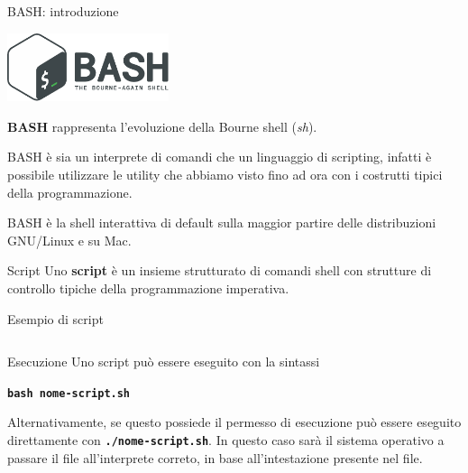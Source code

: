 \documentclass{beamer}
\begin{document}
    \begin{frame}{BASH: introduzione}
        \begin{center}
            \includegraphics[height=2cm, keepaspectratio]{images/bash.pdf}
        \end{center}
        \textbf{BASH} rappresenta l'evoluzione della Bourne shell (\textit{sh}).

        \vspace{0.5cm}

        BASH è sia un interprete di comandi che un linguaggio di scripting, infatti è
        possibile utilizzare le utility che abbiamo visto fino ad ora con i costrutti tipici
        della programmazione.

        \vspace{0.5cm}

        BASH è la shell interattiva di default sulla maggior partire
        delle distribuzioni GNU/Linux e su Mac.
    \end{frame}

    \begin{frame}[fragile]{Script}
        Uno \textbf{script} è un insieme strutturato di comandi shell con strutture di controllo
        tipiche della programmazione imperativa.



        \begin{exampleblock}{Esempio di script}
            \inputminted[fontsize=\small]{bash}{script/first-example.sh}
        \end{exampleblock}

        \begin{alertblock}{Esecuzione}
            \small
            Uno script può essere eseguito con la sintassi

            \begin{center}
                \texttt{\textbf{bash nome-script.sh}}
            \end{center}

            Alternativamente, se questo possiede il permesso di esecuzione può essere eseguito direttamente
            con \texttt{\textbf{./nome-script.sh}}. In questo caso sarà il sistema operativo
            a passare il file all'interprete correto, in base all'intestazione presente nel file.
        \end{alertblock}
    \end{frame}
\end{document}
